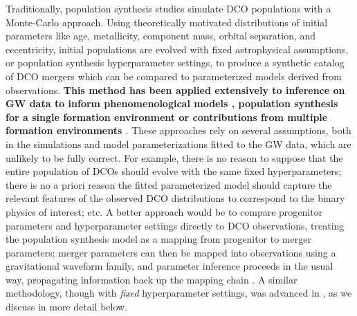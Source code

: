 \documentclass[twocolumn]{aastex631}
\begin{document}
Traditionally, population synthesis studies simulate DCO populations with a
Monte-Carlo approach. Using theoretically motivated distributions of initial
parameters like age, metallicity, component mass, orbital separation, and
eccentricity, initial populations are evolved with fixed astrophysical
assumptions, or population synthesis hyperparameter settings, to produce a
synthetic catalog of DCO mergers which can be compared to parameterized models
derived from observations. \textbf{This method has been applied extensively to
inference on GW data to inform phenomenological models
\citep[e.g.][]{Fishbach2017, Wysocki2019, Callister2021, Delfavero2021,
Farah2022, Delfavero2022}, population synthesis for a single formation
environment \citep[e.g.][]{Belczynski2016, Stevenson2017b, Taylor2018,
Barrett2018, Mastrogiovanni2022} or contributions from multiple formation
environments \citep[e.g][]{Zevin2017, Stevenson2017, Bouffanais2019, Zevin2021,
Wong2021, Bouffanais2021, Mapelli2022}}. These approaches rely on several
assumptions, both in the simulations and model parameterizations fitted to the
GW data, which are unlikely to be fully correct. For example, there is no reason
to suppose that the entire population of DCOs should evolve with the same fixed
hyperparameters; there is no a priori reason the fitted parameterized model
should capture the relevant features of the observed DCO distributions to
correspond to the binary physics of interest; etc. A better approach would be to
compare progenitor parameters and hyperparameter settings directly to DCO
observations, treating the population synthesis model as a mapping from
progenitor to merger parameters; merger parameters can then be mapped into
observations using a gravitational waveform family, and parameter inference
proceeds in the usual way, propagating information back up the mapping chain
\citep[e.g.][]{Veitch2015}.  A similar methodology, though with \emph{fixed}
hyperparameter settings, was advanced in \citet{Andrews2018,Andrews2021}, as we
discuss in more detail below.
\end{document}
